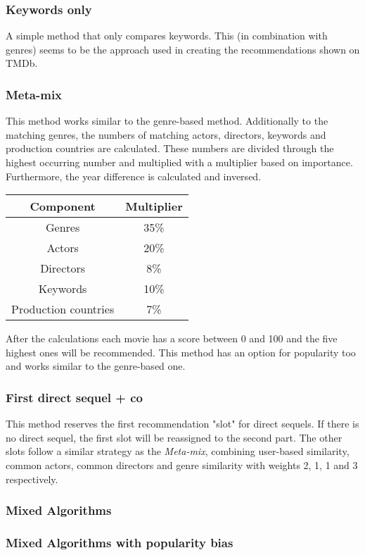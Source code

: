 \documentclass{article}
\begin{document}
\subsubsection{Keywords only}
A simple method that only compares keywords. This (in combination with genres) seems to be the approach used in creating the recommendations shown on TMDb.
\subsubsection{Meta-mix}
This method works similar to the genre-based method. Additionally to the matching genres, the numbers of matching actors, directors, keywords and production countries are calculated. These numbers are divided through the highest occurring number and multiplied with a multiplier based on importance. Furthermore, the year difference is calculated and inversed.
\begin{center}
 \begin{tabular}{||c c||} 
 \hline
 Component & Multiplier \\ [0.5ex] 
 \hline\hline
 Genres & 35\% \\ 
 \hline
 Actors & 20\% \\
 \hline
 Directors & 8\% \\
 \hline
 Keywords & 10\% \\
 \hline
 Production countries & 7\% \\ 
 \hline
\end{tabular}
\end{center}
After the calculations each movie has a score between 0 and 100 and the five highest ones will be recommended. This method has an option for popularity too and works similar to the genre-based one.
\subsubsection{First direct sequel + co}
This method reserves the first recommendation "slot" for direct sequels. If there is no direct sequel, the first slot will be reassigned to the second part. The other slots follow a similar strategy as the \emph{Meta-mix}, combining user-based similarity, common actors, common directors and genre similarity with weights 2, 1, 1 and 3 respectively.
\subsubsection{Mixed Algorithms}
\subsubsection{Mixed Algorithms with popularity bias}
\end{document}
